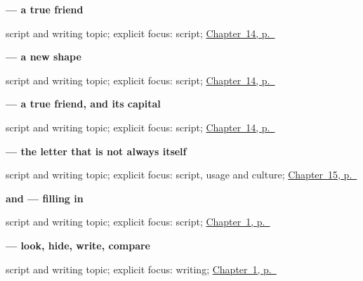 \noindent\begin{minipage}[t]{\linewidth}
\raggedright
\textbf{ — a true friend}\par
\footnotesize script and writing topic; explicit focus: script; \hyperref[ch:ru-script-eleven]{Chapter~14, p.~\pageref*{ch:ru-script-eleven}}
\end{minipage}\par\smallskip

\noindent\begin{minipage}[t]{\linewidth}
\raggedright
\textbf{ — a new shape}\par
\footnotesize script and writing topic; explicit focus: script; \hyperref[ch:ru-script-eleven]{Chapter~14, p.~\pageref*{ch:ru-script-eleven}}
\end{minipage}\par\smallskip

\noindent\begin{minipage}[t]{\linewidth}
\raggedright
\textbf{ — a true friend, and its capital}\par
\footnotesize script and writing topic; explicit focus: script; \hyperref[ch:ru-script-eleven]{Chapter~14, p.~\pageref*{ch:ru-script-eleven}}
\end{minipage}\par\smallskip

\noindent\begin{minipage}[t]{\linewidth}
\raggedright
\textbf{ — the letter that is not always itself}\par
\footnotesize script and writing topic; explicit focus: script, usage and culture; \hyperref[ch:ru-script-eight]{Chapter~15, p.~\pageref*{ch:ru-script-eight}}
\end{minipage}\par\smallskip

\noindent\begin{minipage}[t]{\linewidth}
\raggedright
\textbf{ and  — filling in }\par
\footnotesize script and writing topic; explicit focus: script; \hyperref[ch:russian-greetings]{Chapter~1, p.~\pageref*{ch:russian-greetings}}
\end{minipage}\par\smallskip

\noindent\begin{minipage}[t]{\linewidth}
\raggedright
\textbf{ — look, hide, write, compare}\par
\footnotesize script and writing topic; explicit focus: writing; \hyperref[ch:russian-greetings]{Chapter~1, p.~\pageref*{ch:russian-greetings}}
\end{minipage}\par\smallskip

